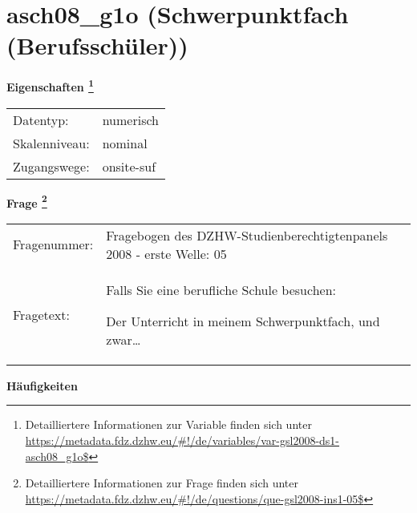 
    \setcounter{footnote}{0}

    \vspace*{-1.8cm}
	\section{asch08\_g1o (Schwerpunktfach (Berufsschüler))}
	\label{section:asch08_g1o}



    \vspace*{0.5cm}
    \noindent\textbf{Eigenschaften
	\footnote{Detailliertere Informationen zur Variable finden sich unter
		\url{https://metadata.fdz.dzhw.eu/\#!/de/variables/var-gsl2008-ds1-asch08_g1o$}}}\\
	\begin{tabularx}{\hsize}{@{}lX}
	Datentyp: & numerisch \\
	Skalenniveau: & nominal \\
	Zugangswege: &
	  onsite-suf
 \\
    \end{tabularx}



				\vspace*{0.5cm}
                \noindent\textbf{Frage
	                \footnote{Detailliertere Informationen zur Frage finden sich unter
		              \url{https://metadata.fdz.dzhw.eu/\#!/de/questions/que-gsl2008-ins1-05$}}}\\
				\begin{tabularx}{\hsize}{@{}lX}
					Fragenummer: &
					  Fragebogen des DZHW-Studienberechtigtenpanels 2008 - erste Welle:
					  05
 \\
					Fragetext: & Falls Sie eine berufliche Schule besuchen:\par  Der Unterricht in meinem Schwerpunktfach, und zwar… \\
				\end{tabularx}





        		\vspace*{0.5cm}
                \noindent\textbf{Häufigkeiten}

